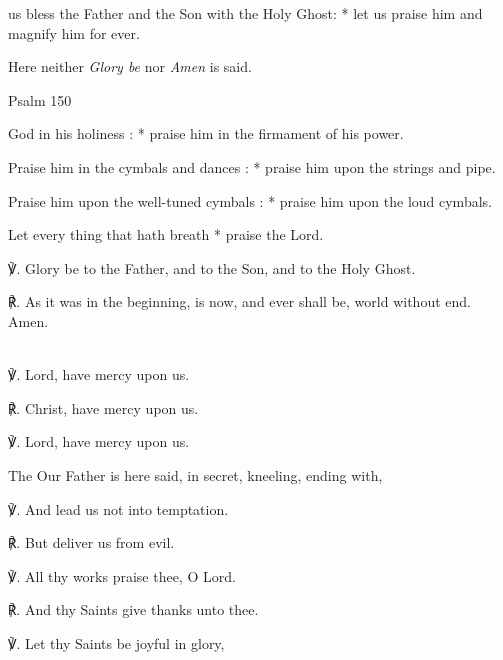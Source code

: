 \begin{multicols}{2}
     us bless the Father and the Son with the Holy Ghost: * let us praise him and magnify him for ever.\par

\begin{rubric}
	Here neither \emph{Glory be} nor \emph{Amen} is said.
\end{rubric}

\begin{inhead}
	Psalm 150
\end{inhead}

 God in his holiness : * praise him in the firmament of his power.\par
{}
Praise him in the cymbals and dances : * praise him upon the strings and pipe.\par
{}Praise him upon the well-tuned cymbals : * praise him upon the loud cymbals.\par
{}Let every thing that hath breath * praise the Lord.\par
℣. Glory be to the Father, and to the Son, and to the Holy Ghost.\par
℟. As it was in the beginning, is now, and ever shall be, world without end. Amen.

\\

℣. Lord, have mercy upon us.

℟. Christ, have mercy upon us.

℣. Lord, have mercy upon us.

\begin{rubric}
    {The Our Father is here said, in secret, kneeling, ending with,}
\end{rubric}

℣. And lead us not into temptation.

℟. But deliver us from evil.

℣. All thy works praise thee, O Lord.

℟. And thy Saints give thanks unto thee.

℣. Let thy Saints be joyful in glory,


\end{multicols}
